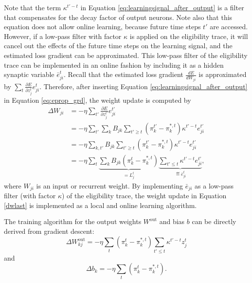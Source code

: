             Note that the term $\kappa^{t'-t}$ in Equation \ref{eq:learningsignal_after_output} is a filter that compensates for the decay factor of output neurons.
            Note also that this equation does not allow online learning, because future time steps $t'$ are accessed.
            However, if a low-pass filter with factor $\kappa$ is applied on the eligibility trace, it will cancel out the effects of the future time steps on the learning signal, and the estimated loss gradient can be approximated.
            This low-pass filter of the eligibility trace can be implemented in an online fashion by including it as a hidden synaptic variable $\bar{e}^t_{ji}$.
            Recall that the estimated loss gradient $\frac{dE}{dW_{ji}}$ is approximated by $\sum_t \frac{\partial E}{\partial z^t_j}e^t_{ji}$.
            Therefore, after inserting Equation \ref{eq:learningsignal_after_output} in Equation \ref{eq:eprop_grd}, the weight update is computed by
            \begin{align}
            \Delta W_{ji} &= -\eta\sum_{t'}\frac{\partial E}{\partial z^{t'}_j}e^{t'}_{ji}\\
            &= -\eta\sum_{t'}\sum_kB_{jk}\sum_{t'\geq t}\left(\pi^{t'}_k - \pi^{*,t}_k\right)\kappa^{t'-t}e^{t'}_{ji}\\
            &= -\eta\sum_{k, t'}B_{jk}\sum_{t'\geq t}\left(\pi^{t'}_k - \pi^{*,t}_k\right)\kappa^{t'-t}e^{t'}_{ji}\\
            &= -\eta\sum_t\underbrace{\sum_kB_{jk}\left(\pi^{t}_k - \pi^{*,t}_k\right)}_{=L^t_j}\underbrace{\sum_{t'\leq t}\kappa^{t'-t}e^{t'}_{ji}}_{\eqdef \bar{e}^t_{ji}}\label{dwlast},
            \end{align}
            where $W_{ji}$ is an input or recurrent weight.
            By implementing $\bar{e}_{ji}$ as a low-pass filter (with factor $\kappa$) of the eligibility trace, the weight update in Equation \ref{dwlast} is implemented as a local and online learning algorithm.

            The training algorithm for the output weights $W^\text{out}$ and bias $b$ can be directly derived from gradient descent:
            \begin{equation}
            \Delta W^\text{out}_{kj} = -\eta \sum_t\left(\pi^t_k - \pi^{*,t}_k\right)\sum_{t'\leq t}\kappa^{t'-t}z^t_j
            \end{equation}
            and
            \begin{equation}
            \Delta b_k = -\eta \sum_t\left(\pi^t_k - \pi^{*,t}_k\right).
            \end{equation}


